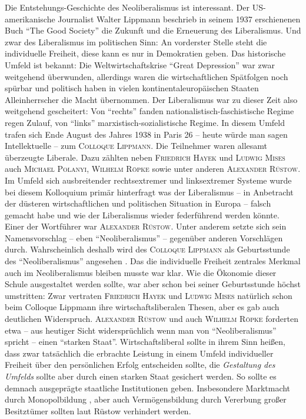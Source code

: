 Die Entstehungs-Geschichte des Neoliberalismus ist interessant. Der US-amerikanische Journalist Walter Lippmann beschrieb in seinem 1937 erschienenen Buch  "`The Good Society"' \parencite{Lippmann1937} die Zukunft und die Erneuerung des Liberalismus. Und zwar des Liberalismus im politischen Sinn: An vorderster Stelle steht die individuelle Freiheit, diese kann es nur in Demokratien geben.  Das historische Umfeld ist bekannt: Die Weltwirtschaftskrise "`Great Depression"' war zwar weitgehend überwunden, allerdings waren die wirtschaftlichen Spätfolgen noch spürbar und politisch haben in vielen kontinentaleuropäischen Staaten Alleinherrscher die Macht übernommen. Der Liberalismus war zu dieser Zeit also weitgehend gescheitert: Von "`rechts"' fanden nationalistisch-faschistische Regime regen Zulauf, von "`links"' marxistisch-sozialistische Regime. In diesem Umfeld trafen sich Ende August des Jahres 1938 in Paris 26 -- heute würde man sagen Intellektuelle --  zum \textsc{Colloque Lippmann}. Die Teilnehmer waren allesamt überzeugte Liberale. 
Dazu zählten neben \textsc{Friedrich Hayek} und \textsc{Ludwig Mises} auch \textsc{Michael Polanyi, Wilhelm Röpke} sowie unter anderen \textsc{Alexander Rüstow}. Im Umfeld sich ausbreitender rechtsextremer und linksextremer Systeme wurde bei diesem Kolloquium primär hinterfragt was der Liberalismus -- in Anbetracht der düsteren wirtschaftlichen und politischen Situation in Europa -- falsch gemacht habe und wie der Liberalismus wieder federführend werden könnte. Einer der Wortführer war \textsc{Alexander Rüstow}. Unter anderem setzte sich sein Namensvorschlag -- eben "`Neoliberalismus"' -- gegenüber anderen Vorschlägen durch. Wahrscheinlich deshalb wird des \textsc{Colloque Lippmann} als Geburtsstunde des "`Neoliberalismus"' angesehen \parencite{Horn2018}.
Das die individuelle Freiheit zentrales Merkmal auch im Neoliberalismus bleiben musste war klar. Wie die Ökonomie dieser Schule ausgestaltet werden sollte, war aber schon bei seiner Geburtsstunde höchst umstritten:  Zwar vertraten \textsc{Friedrich Hayek} und \textsc{Ludwig Mises} natürlich schon beim Colloque Lippmann ihre wirtschaftsliberalen Thesen, aber es gab auch deutlichen Widerspruch. \textsc{Alexander Rüstow} und auch \textsc{Wilhelm Röpke} forderten etwa -- aus heutiger Sicht widersprüchlich wenn man von "`Neoliberalismus"' spricht -- einen "`starken Staat"'. Wirtschaftsliberal sollte in ihrem Sinn heißen, dass zwar tatsächlich die erbrachte Leistung in einem Umfeld individueller Freiheit über den persönlichen Erfolg entscheiden sollte, die \textit{Gestaltung des Umfelds} sollte aber durch einen starken Staat gesichert werden. So sollte es demnach ausgeprägte staatliche Institutionen geben. Insbesondere Marktmacht durch Monopolbildung \parencite[S. 69ff]{Hegner2000}, aber auch Vermögensbildung durch Vererbung \parencite[S. 58ff]{Hegner2000} großer Besitztümer sollten laut Rüstow verhindert werden. 

